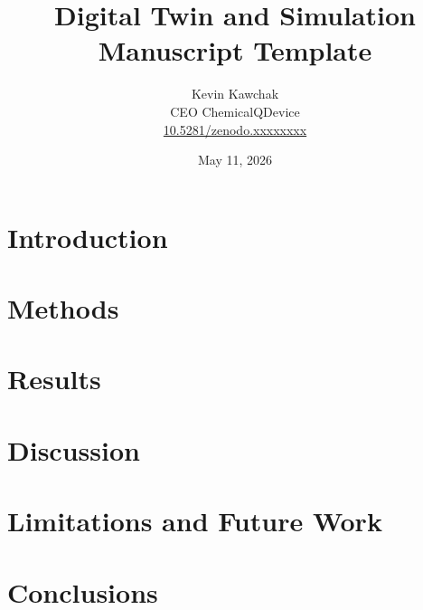 \documentclass[11pt]{article}
\title{Digital Twin and Simulation Manuscript Template}
\author{
  Kevin Kawchak\hspace{2pt}\orcidicon{0009-0007-5457-8667} \\
  CEO ChemicalQDevice\\
  \href{https://doi.org/10.5281/zenodo.xxxxxxxx}{10.5281/zenodo.xxxxxxxx} \\
}
\date{May 11, 2026}
\begin{document}
\maketitle

\begin{abstract}

\end{abstract}

\keywords{ }

\vspace{-0.2cm}

\section{Introduction}
\label{sec:introduction}


\tableofcontents
\vspace{0.4cm}

\newpage
\section{Methods}
\label{sec:methods}

\newpage

\section{Results}
\label{sec:results}

\newpage

\section{Discussion}
\label{sec:discussion}


\section{Limitations and Future Work}
\label{sec:limitations}

\newpage

\section{Conclusions}
\label{sec:conclusions}

\newpage

{}
\begingroup
\raggedright


\endgroup
\newpage


\end{document}
